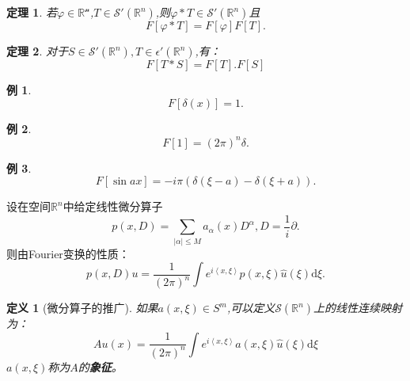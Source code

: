 \documentclass[a4paper]{ctexart}
\newtheorem{Definition}{\hspace{2em}定义}[section]
\newtheorem{Example}{\hspace{2em}例}[section]
\newtheorem{Thm}{\hspace{2em}定理}[section]
\newcommand{\Rn}{\mathbb{R}^{n}}
\newcommand{\dif}{\mathrm{d}}
\newcommand{\innerprod}[2]{\left<#1,#2\right>}
\begin{document}
\begin{Thm}
    若$\varphi\in\mathscr{\Rn}$,$T\in\mathscr{S}'(\Rn)$,则$\varphi*T\in\mathscr{S}'(\Rn)$且
    \begin{equation}
        F[\varphi*T]=F[\varphi]F[T].
    \end{equation}
\end{Thm}
\begin{Thm}
    对于$S\in\mathscr{S}'(\Rn),T\in\epsilon'(\Rn)$,有：
    \begin{equation}
        F[T*S]=F[T].F[S]
    \end{equation}
\end{Thm}
\begin{Example}
    \begin{equation}
        F[\delta(x)]=1.
    \end{equation}
\end{Example}
\begin{Example}
    \begin{equation}
        F[1]=(2\pi)^{n}\delta.
    \end{equation}
\end{Example}
\begin{Example}
    \begin{equation}
        F[\sin ax]=-i\pi(\delta(\xi-a)-\delta(\xi+a)).
    \end{equation}
\end{Example}
设在空间$\Rn$中给定线性微分算子
\begin{equation}
    p(x,D)=\sum_{|\alpha|\le M}a_{\alpha}(x)D^{\alpha},D=\frac{1}{i}\partial.
\end{equation}
则由Fourier变换的性质：
\begin{equation}
    p(x,D)u=\frac{1}{(2\pi)^{n}}\int e^{i\innerprod{x}{\xi}}p(x,\xi)\hat{u}(\xi)\dif\xi.
\end{equation}
\begin{Definition}[微分算子的推广]
    如果$a(x,\xi)\in S^{m}$,可以定义$\mathscr{S}(\Rn)$上的线性连续映射为：
    \begin{equation}
        Au(x)=\frac{1}{(2\pi)^{n}}\int e^{i\innerprod{x}{\xi}}a(x,\xi)\hat{u}(\xi)\dif\xi
    \end{equation}
    $a(x,\xi)$称为$A$的\textbf{象征}。
\end{Definition}
\end{document}
